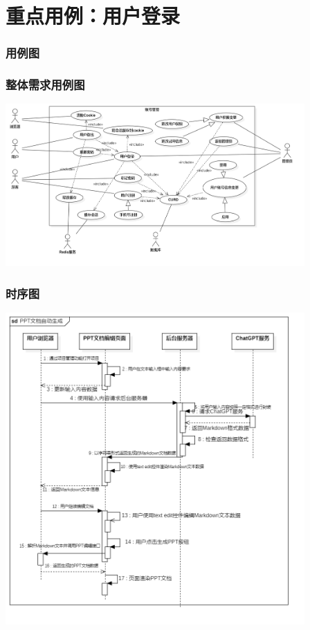 \section{重点用例：用户登录}
\begin{frame}
    \frametitle{用例图}
    \frametitle{整体需求用例图}
    \center
    \includegraphics[width=4.5in]{contents/figure/login_usecase_diagram.png}
\end{frame}
\begin{frame}
    \frametitle{时序图}
    \center
    \includegraphics[width=4.5in]{contents/figure/ppt_generator_sequence_diagram.png}
\end{frame}